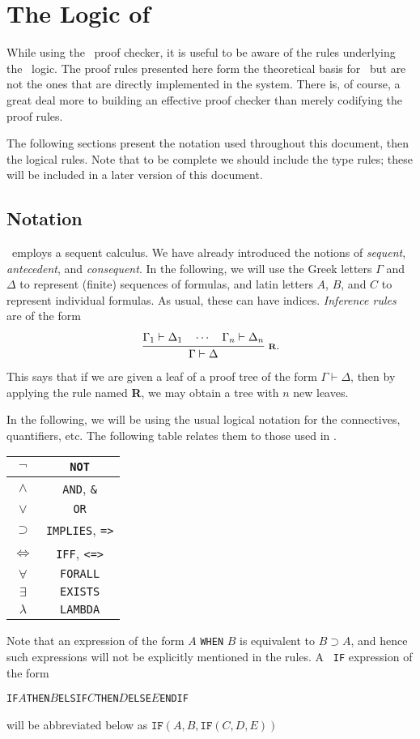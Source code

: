 \documentclass[12pt,twoside]{book}
\begin{document}
\chapter{The Logic of \pvs} 
\label{logic}


While using the \pvs\ proof checker, it is useful to be aware of the
rules underlying the \pvs\ logic.  The proof rules presented here
form the theoretical basis for \pvs\ but are not the ones that
are directly implemented in the system.   There is, of course,
a great deal more to building an effective proof checker than merely
codifying the proof rules.

The following sections present the notation used throughout this
document, then the logical rules.  Note that to be complete we should
include the type rules; these will be included in a later version of
this document.

\section{Notation}

\pvs\ employs a sequent calculus.  We have already introduced the
notions of \emph{sequent}, \emph{antecedent}, and \emph{consequent}.
In the following, we will use the Greek letters $\Gamma$ and $\Delta$ to
represent (finite) sequences of formulas, and latin letters $A$, $B$, and
$C$ to represent individual formulas.  As usual, these can have indices.
\emph{Inference rules} are of the form
$${{\displaystyle\strut \Gamma_1\vdash\Delta_1\quad\cdots\quad\Gamma_n\vdash\Delta_n}\over{\displaystyle\strut \Gamma\vdash\Delta}}\;\mbox{\scriptsize$\bf R$}.$$ This says that if we are given a leaf of a
proof tree of the form $\Gamma\vdash\Delta$, then by applying the rule
named {\bf R}, we may obtain a tree with $n$ new leaves.

In the following, we will be using the usual logical notation for the
connectives, quantifiers, etc.  The following table relates them to
those used in \pvs.

\begin{center}
\begin{tabular}{|c|c|}\hline
$\neg$ & \texttt{NOT}\\\hline
$\wedge$ & \texttt{AND}, \texttt{\&}\\\hline
$\vee$ & \texttt{OR}\\\hline
$\supset$ & \texttt{IMPLIES}, \texttt{=>}\\\hline
$\iff$ & \texttt{IFF}, \texttt{<=>}\\\hline
$\forall$ & \texttt{FORALL}\\\hline
$\exists$ & \texttt{EXISTS}\\\hline
$\lambda$ & \texttt{LAMBDA}\\\hline
\end{tabular}
\end{center}
Note that an expression of the form $A$ \texttt{WHEN} $B$ is equivalent to
$B\supset A$, and hence such expressions will not be explicitly
mentioned in the rules.  A \pvs\ \texttt{IF} expression of the form
\begin{alltt}
  IF \(A\) THEN \(B\) ELSIF \(C\) THEN \(D\) ELSE \(E\) ENDIF
\end{alltt}
will be abbreviated  below as $\texttt{IF}(A,B,\texttt{IF}(C,D,E))$
\end{document}
